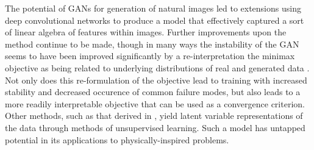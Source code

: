 \documentclass{article}
\begin{document}
	The potential of GANs for generation of natural images led to extensions using deep convolutional networks to produce a model that effectively captured a sort of linear algebra of features within images.  Further improvements upon the method continue to be made, though in many ways the instability of the GAN seems to have been improved significantly by a re-interpretation the minimax objective as being related to underlying distributions of real and generated data \cite{Arjovsky2017WassersteinGAN}. Not only does this re-formulation of the objective lead to training with increased stability and decreased occurence of common failure modes, but also leads to a more readily interpretable objective that can be used as a convergence criterion. Other methods, such as that derived in \cite{Chen2016InfoGAN:Nets}, yield latent variable representations of the data through methods of unsupervised learning.  Such a model has untapped potential in its applications to physically-inspired problems.
\end{document}
